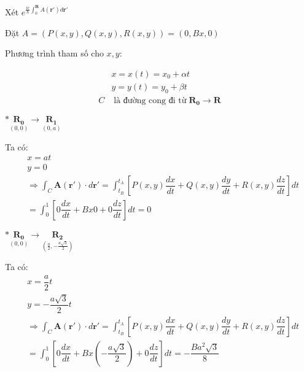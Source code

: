 \documentclass{article}
\begin{document}
\noindent Xét $e^{\frac{ie}{\hbar}\int_{0}^{\mathbf{R}}A(\mathbf{r'})d\mathbf{r'}}$

\noindent Đặt $A = \left(P(x,y),Q(x,y),R(x,y)\right) = (0,Bx,0)$

\noindent Phương trình tham số cho $x,y$:

\begin{align*}
	  & x = x(t) = x_0 + \alpha t                                            \\
	  & y = y(t) = y_0 + \beta t                                             \\
	C & \; \text{là đường cong đi từ} \; \mathbf{R_0} \rightarrow \mathbf{R}
\end{align*}

\clearpage

\noindent $\ast \underset{(0,0)}{\mathbf{R_0}}  \longrightarrow \underset{(0,a)}{\mathbf{R_1}}$

Ta có:
\begin{align*}
	 & x = at                                                                                                                                                                  \\
	 & y = 0                                                                                                                                                                   \\
	 & \Rightarrow \int_{C} \mathbf{A}(\mathbf{r'})\cdot d\mathbf{r'} =  \int_{t_B}^{t_A} \left[ P(x,y)\dfrac{dx}{dt} + Q(x,y)\dfrac{dy}{dt} + R(x,y)\dfrac{dz}{dt} \right] dt \\
	 & = \int_{0}^{1} \left[ 0\dfrac{dx}{dt} + Bx0 + 0\dfrac{dz}{dt} \right] dt = 0
\end{align*}

\noindent $\ast \underset{(0,0)}{\mathbf{R_0}}  \longrightarrow \underset{(\frac{a}{2},-\frac{a\sqrt{3}}{2})}{\mathbf{R_2}}$

Ta có:
\begin{align*}
	 & x = \dfrac{a}{2}t                                                                                                                                                       \\
	 & y = -\dfrac{a\sqrt{3}}{2}t                                                                                                                                              \\
	 & \Rightarrow \int_{C} \mathbf{A}(\mathbf{r'})\cdot d\mathbf{r'} =  \int_{t_B}^{t_A} \left[ P(x,y)\dfrac{dx}{dt} + Q(x,y)\dfrac{dy}{dt} + R(x,y)\dfrac{dz}{dt} \right] dt \\
	 & = \int_{0}^{1} \left[ 0\dfrac{dx}{dt} + Bx\left(-\dfrac{a\sqrt{3}}{2}\right) + 0\dfrac{dz}{dt} \right] dt = -\dfrac{Ba^2\sqrt{3}}{8}
\end{align*}
\end{document}
